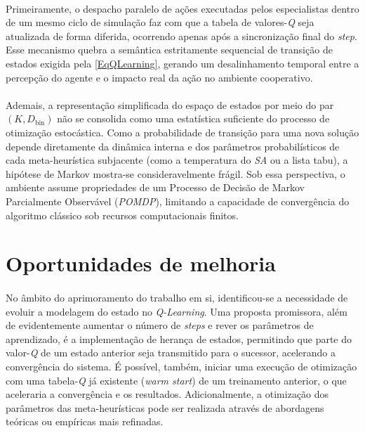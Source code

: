 \paragraph{} Primeiramente, o despacho paralelo de ações executadas pelos especialistas dentro de um mesmo ciclo de simulação faz com que a tabela de valores-\textit{Q} seja atualizada de forma diferida, ocorrendo apenas após a sincronização final do \textit{step}. Esse mecanismo quebra a semântica estritamente sequencial de transição de estados exigida pela \autoref{EqQLearning}, gerando um desalinhamento temporal entre a percepção do agente e o impacto real da ação no ambiente cooperativo.

\paragraph{} Ademais, a representação simplificada do espaço de estados por meio do par $(K, D_{\text{bin}})$ não se consolida como uma estatística suficiente do processo de otimização estocástica. Como a probabilidade de transição para uma nova solução depende diretamente da dinâmica interna e dos parâmetros probabilísticos de cada meta-heurística subjacente (como a temperatura do \textit{SA} ou a lista tabu), a hipótese de Markov mostra-se consideravelmente frágil. Sob essa perspectiva, o ambiente assume propriedades de um Processo de Decisão de Markov Parcialmente Observável (\textit{POMDP}), limitando a capacidade de convergência do algoritmo clássico sob recursos computacionais finitos.

\section{Oportunidades de melhoria}

\paragraph{} No âmbito do aprimoramento do trabalho em si, identificou-se a necessidade de evoluir a modelagem do estado no \textit{Q-Learning}. Uma proposta promissora, além de evidentemente aumentar o número de \textit{steps} e rever os parâmetros de aprendizado, é a implementação de herança de estados, permitindo que parte do valor-\textit{Q} de um estado anterior seja transmitido para o sucessor, acelerando a convergência do sistema. É possível, também, iniciar uma execução de otimização com uma tabela-\textit{Q} já existente (\textit{warm start}) de um treinamento anterior, o que aceleraria a convergência e os resultados. Adicionalmente, a otimização dos parâmetros das meta-heurísticas pode ser realizada através de abordagens teóricas ou empíricas mais refinadas.


